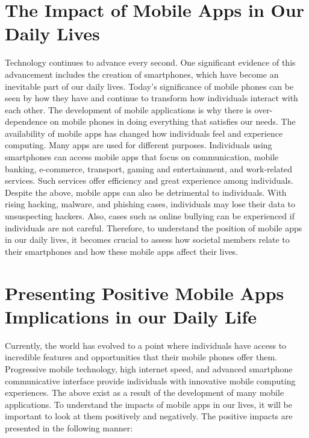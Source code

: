 \documentclass{article}
\begin{document}
\section*{The Impact of Mobile Apps in Our Daily Lives}
Technology continues to advance every second. One significant evidence of this advancement includes the creation of smartphones, which have become an inevitable part of our daily lives. Today's significance of mobile phones can be seen by how they have and continue to transform how individuals interact with each other. The development of mobile applications is why there is over-dependence on mobile phones in doing everything that satisfies our needs. The availability of mobile apps has changed how individuals feel and experience computing. Many apps are used for different purposes. Individuals using smartphones can access mobile apps that focus on communication, mobile banking, e-commerce, transport, gaming and entertainment, and work-related services. Such services offer efficiency and great experience among individuals. Despite the above, mobile apps can also be detrimental to individuals. With rising hacking, malware, and phishing cases, individuals may lose their data to unsuspecting hackers. Also, cases such as online bullying can be experienced if individuals are not careful. Therefore, to understand the position of mobile apps in our daily lives, it becomes crucial to assess how societal members relate to their smartphones and how these mobile apps affect their lives. 

\medskip

\section*{Presenting Positive Mobile Apps Implications in our Daily Life}
Currently, the world has evolved to a point where individuals have access to incredible features and opportunities that their mobile phones offer them. Progressive mobile technology, high internet speed, and advanced smartphone communicative interface provide individuals with innovative mobile computing experiences. The above exist as a result of the development of many mobile applications. To understand the impacts of mobile apps in our lives, it will be important to look at them positively and negatively. The positive impacts are presented in the following manner: 

\medskip
\end{document}

